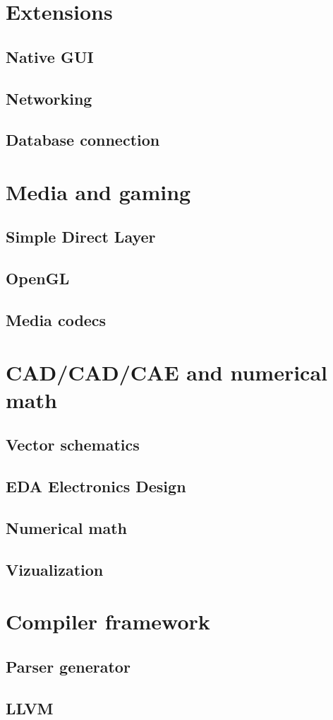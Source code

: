 \section{Extensions}
\subsection{Native GUI}
\subsection{Networking}
\subsection{Database connection}

\section{Media and gaming}
\subsection{Simple Direct Layer}
\subsection{OpenGL}
\subsection{Media codecs}

\section{CAD/CAD/CAE and numerical math}
\subsection{Vector schematics}
\subsection{EDA Electronics Design}
\subsection{Numerical math}
\subsection{Vizualization}

\section{Compiler framework}
\subsection{Parser generator}
\subsection{LLVM}
